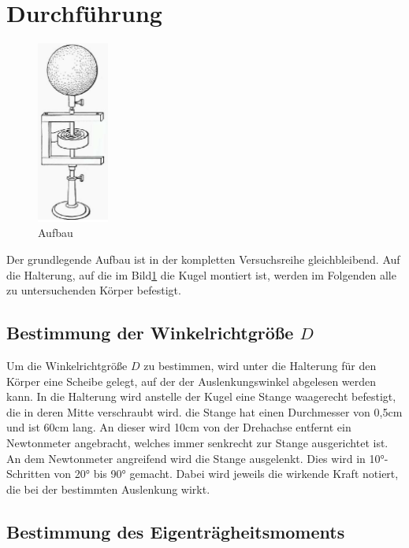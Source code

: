 \section{Durchführung}
\label{sec:Durchführung}

\begin{figure}
    \centering
    \includegraphics[height=6cm]{data/Bild_1.png}
    \caption{Aufbau}
    \label{fig:aufbau}
\end{figure}

Der grundlegende Aufbau ist in der kompletten Versuchsreihe gleichbleibend. Auf die Halterung, auf die im Bild\ref{fig:aufbau} die Kugel
montiert ist, werden im Folgenden alle zu untersuchenden Körper befestigt. 

\subsection{Bestimmung der Winkelrichtgröße $D$}

Um die Winkelrichtgröße $D$ zu bestimmen, wird unter die Halterung für den Körper eine Scheibe gelegt, auf der der Auslenkungswinkel 
abgelesen werden kann. In die Halterung wird anstelle der Kugel eine Stange waagerecht befestigt, die in deren Mitte verschraubt wird.
die Stange hat einen Durchmesser von 0,5$\si{\centi\meter}$ und ist 60$\si{\centi\meter}$ lang. An dieser wird 10$\si{\centi\meter}$
von der Drehachse entfernt ein Newtonmeter angebracht, welches immer senkrecht zur Stange ausgerichtet ist. An dem Newtonmeter 
angreifend wird die Stange ausgelenkt. Dies wird in 10$\si{\degree}$-Schritten von 20$\si{\degree}$ bis 90$\si{\degree}$ gemacht.
Dabei wird jeweils die wirkende Kraft notiert, die bei der bestimmten Auslenkung wirkt. 

\subsection{Bestimmung des Eigenträgheitsmoments}

